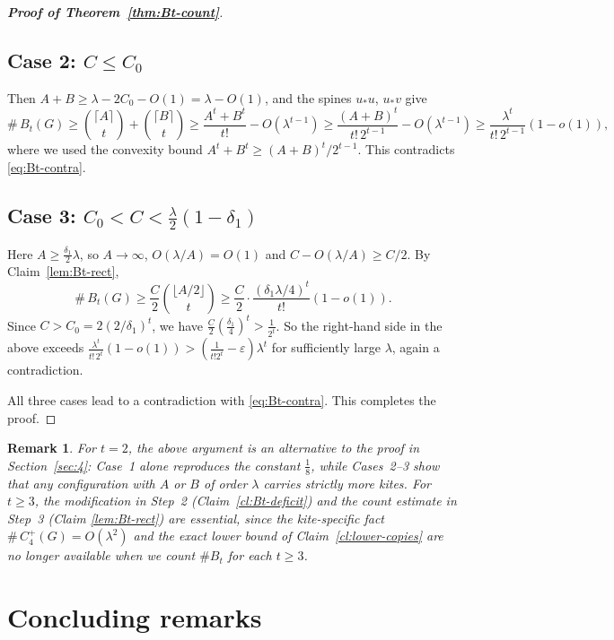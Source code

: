 \documentclass[10pt,a4paper]{amsart}
\newtheorem{remark}{Remark}
\renewcommand{\le}{\leqslant}
\renewcommand{\ge}{\geqslant}
\begin{document}
\begin{proof}[{\bf Proof of Theorem~\ref{thm:Bt-count}}]
\subsection*{Case 2: $C\le C_0$} 

Then $A+B\ge\lambda-2C_0-O(1)=\lambda-O(1)$, and
the spines $u_*u$, $u_*v$ give
\[
   \texttt{\#}\,B_t(G)\ge\binom{\lceil A\rceil}{t} \!+ \! \binom{\lceil B\rceil}{t}
   \ge\frac{A^t+B^t}{t!}-O(\lambda^{t-1})
   \ge\frac{(A+B)^t}{t!\,2^{t-1}}-O(\lambda^{t-1})
   \ge\frac{\lambda^t}{t!\,2^{t-1}}(1-o(1)),
\]
where we used the convexity bound $A^t+B^t\ge(A+B)^t/2^{t-1}$.  This contradicts
\eqref{eq:Bt-contra}.

\subsection*{Case 3: $C_0<C<\tfrac\lambda2(1-\delta_1)$}   

Here
$A\ge\tfrac{\delta_1}{2}\lambda$, so $A\to\infty$, $O(\lambda/A)=O(1)$ and
$C-O(\lambda/A)\ge C/2$.  By Claim~\ref{lem:Bt-rect},
\[
   \texttt{\#}\,B_t(G)\ge\frac{C}{2}\binom{\lfloor A/2\rfloor}{t}
   \ge\frac{C}{2}\cdot\frac{(\delta_1\lambda/4)^t}{t!}(1-o(1)).
\]
Since $C>C_0=2(2/\delta_1)^t$, we have
$\tfrac C2(\tfrac{\delta_1}{4})^t>\tfrac1{2^t}$. So the right-hand side in the above exceeds
$\tfrac{\lambda^t}{t!\,2^t}(1-o(1)) 
>(\tfrac1{t!2^t}-\varepsilon)
\lambda^t$ for sufficiently large $\lambda$, again a contradiction.

All three cases lead to a contradiction with 
\eqref{eq:Bt-contra}. This completes the proof. 
\end{proof}

\begin{remark}
For $t=2$, the above argument is an alternative to the proof in Section~\ref{sec:4}:
Case~1 alone reproduces the constant $\tfrac18$, while Cases~2--3 show that
any configuration with $A$ or $B$ of order $\lambda$ carries strictly more
kites.  For $t\ge3$, the modification in Step~2 (Claim~\ref{cl:Bt-deficit}) and
the count estimate in Step~3 (Claim \ref{lem:Bt-rect}) are essential, since the kite-specific fact 
$\texttt{\#}\,C_4^+(G)=O(\lambda^2)$ and the exact lower bound of Claim~\ref{cl:lower-copies} are no longer available when we count $\texttt{\#}B_t$ for each $t\ge 3$.
\end{remark}





\section{Concluding remarks}
\label{sec:concluding}
\end{document}
